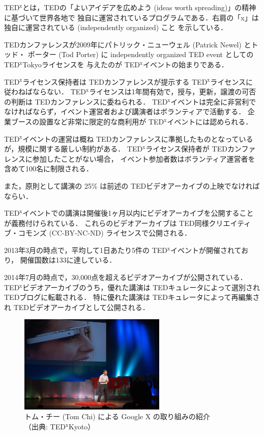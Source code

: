 \documentclass[submit,techreq,jkeyword,noauthor]{ipsj}
\newcommand{\TED}{\textrm{TED}}
\newcommand{\TEDx}{\TED${}^{\textrm{x}}$}
\newcommand{\TEDxTokyo}{\TEDx\textrm{Tokyo}}
\newcommand{\TEDxKyoto}{\TEDx\textrm{Kyoto}}
\begin{document}
\TEDx とは，\TED の「よいアイデアを広めよう (ideas worth spreading)」の精神に基づいて世界各地で
独自に運営されているプログラムである．右肩の「x」は独自に運営されている (independently organized) こと
を示している．

\TED カンファレンスが2009年にパトリック・ニューウェル (Patrick Newel) とトッド・
ポーター (Tod Porter) に independently organized TED event としての \TEDxTokyo ライセンスを
与えたのが \TEDx イベントの始まりである．

\TEDx ライセンス保持者は \TED カンファレンスが提示する \TEDx ライセンス\cite{tedxrules}に
従わねばならない．
\TEDx ライセンスは1年間有効で，授与，更新，譲渡の可否の判断は \TED カンファレンスに委ねられる．
\TEDx イベントは完全に非営利でなければならず，イベント運営者および講演者はボランティアで活動する．
企業ブースの設置など非常に限定的な商利用が \TEDx イベントには認められる．

\TEDx イベントの運営は概ね \TED カンファレンスに準拠したものとなっているが，規模に関する厳しい制約がある．
\TEDx ライセンス保持者が \TED カンファレンスに参加したことがない場合，
イベント参加者数はボランティア運営者を含めて100名に制限される．

また，原則として講演の 25\% は前述の \TED ビデオアーカイブの上映でなければならい．

\TEDx イベントでの講演は開催後1ヶ月以内にビデオアーカイブを公開することが義務付けられている．
これらのビデオアーカイブは \TED 同様クリエイティブ・コモンズ (CC-BY-NC-ND) ライセンスで公開される．

2013年3月の時点で，平均して1日あたり5件の \TEDx イベントが開催されており，
開催国数は133に達している．\cite{nh,mf}

2014年7月の時点で，30,000点を超えるビデオアーカイブが公開されている．
\TEDx ビデオアーカイブのうち，優れた講演は \TED キュレータによって選別され \TED ブログに転載される．
特に優れた講演は \TED キュレータによって再編集され \TED ビデオアーカイブとして公開される．\cite{tedxtalksweb}

\begin{figure}[t]
\begin{center}
\includegraphics[width=7cm,clip]{tom_chi.png}
\end{center}
\caption{トム・チー (Tom Chi) による Google X の取り組みの紹介\\
（出典: \TEDxKyoto ）}
\label{fig:tomchi}
\end{figure}
\end{document}
